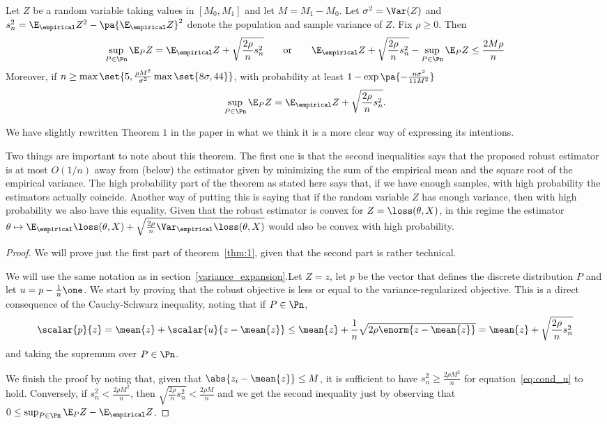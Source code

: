 \begin{theorem}\label{thm:1}
    Let $Z$ be a random variable taking values in $[M_0, M_1]$ and let $M = M_1 - M_0$. Let $\sigma^2 = \Var(Z)$ and $s^2_n = \E_{\empirical} Z^2 - \pa{\E_{\empirical} Z}^2$ denote the population and sample variance of $Z$. Fix $\rho \geq 0$. Then
    \[
    \sup_{P \in\Pn}\E_P Z = \E_{\empirical} Z + \sqrt{\frac{2\rho}{n}s^2_n}
    \qquad \text{or} \qquad
    \E_{\empirical} Z + \sqrt{\frac{2\rho}{n}s^2_n} - \sup_{P \in \Pn}\E_P Z \leq \frac{2M\rho}{n}
    \]
    Moreover, if $n \geq \max\set{5, \frac{\rho M^2}{\sigma^2}\max\set{8\sigma, 44}}$, with probability at least $1-\exp\pa{-\frac{n\sigma^2}{11M^2}}$
    \[
        \sup_{P \in \Pn} \E_P Z = \E_{\empirical} Z + \sqrt{\frac{2\rho}{n} s^2_n}.
    \]
\end{theorem}
We have slightly rewritten Theorem $1$ in the paper in what we think it is a more clear way of expressing its intentions.

Two things are important to note about this theorem. The first one is that the second inequalities says that the proposed robust estimator is at most $O(1/n)$ away from (below) the estimator given by minimizing the sum of the empirical mean and the square root of the empirical variance. The high probability part of the theorem as stated here says that, if we have enough samples, with high probability the estimators actually coincide. Another way of putting this is saying that if the random variable $Z$ has enough variance, then with high probability we also have this equality. Given that the robust estimator is convex for $Z = \loss(\theta, X)$, in this regime the estimator $\theta \mapsto \E_{\empirical} \loss(\theta, X) + \sqrt{\frac{2\rho}{n}\Var_{\empirical}\loss(\theta, X)}$ would also be convex with high probability.
\begin{proof}
    We will prove just the first part of theorem~\ref{thm:1}, given that the second part is rather technical.

    We will use the same notation as in section~\ref{variance_expansion}.Let $Z = z$, let $p$ be the vector that defines the discrete distribution $P$ and let $u = p - \frac{1}{n}\one$. We start by proving that the robust objective is less or equal to the variance-regularized objective. This is a direct consequence of the Cauchy-Schwarz inequality, noting that if $P \in \Pn$,
    \[
        \scalar{p}{z} = \mean{z} + \scalar{u}{z-\mean{z}} \leq \mean{z} + \frac{1}{n}\sqrt{2\rho \enorm{z-\mean{z}}} = \mean{z} + \sqrt{\frac{2\rho}{n} s^2_n}
    \]
    and taking the supremum over $P \in \Pn$.

    We finish the proof by noting that, given that $\abs{z_i - \mean{z}} \leq M$, it is sufficient to have $s^2_n \geq \frac{2\rho M^2}{n}$ for equation~\eqref{eq:cond_u} to hold. Conversely, if $s^2_n < \frac{2\rho M^2}{n}$, then $\sqrt{\frac{2\rho}{n}s^2_n} < \frac{2\rho M}{n}$ and we get the second inequality just by observing that $0 \leq \sup_{P \in \Pn} \E_P Z - \E_{\empirical} Z$.
\end{proof}

